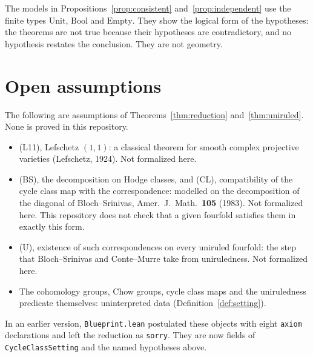 \documentclass[11pt,a4paper]{article}
\theoremstyle{definition}
\begin{document}
The models in Propositions~\ref{prop:consistent} and~\ref{prop:independent} use the finite types $\mathrm{Unit}$, $\mathrm{Bool}$ and $\mathrm{Empty}$. They show the logical form of the hypotheses: the theorems are not true because their hypotheses are contradictory, and no hypothesis restates the conclusion. They are not geometry.

\section{Open assumptions}\label{sec:open}
The following are assumptions of Theorems~\ref{thm:reduction} and~\ref{thm:uniruled}. None is proved in this repository.
\begin{itemize}
  \item (L11), Lefschetz $(1,1)$: a classical theorem for smooth complex projective varieties (Lefschetz, 1924). Not formalized here.
  \item (BS), the decomposition on Hodge classes, and (CL), compatibility of the cycle class map with the correspondence: modelled on the decomposition of the diagonal of Bloch--Srinivas, Amer.\ J.\ Math.\ \textbf{105} (1983). Not formalized here. This repository does not check that a given fourfold satisfies them in exactly this form.
  \item (U), existence of such correspondences on every uniruled fourfold: the step that Bloch--Srinivas and Conte--Murre take from uniruledness. Not formalized here.
  \item The cohomology groups, Chow groups, cycle class maps and the uniruledness predicate themselves: uninterpreted data (Definition~\ref{def:setting}).
\end{itemize}
In an earlier version, \texttt{Blueprint.lean} postulated these objects with eight \texttt{axiom} declarations and left the reduction as \texttt{sorry}. They are now fields of \texttt{CycleClassSetting} and the named hypotheses above.
\end{document}

